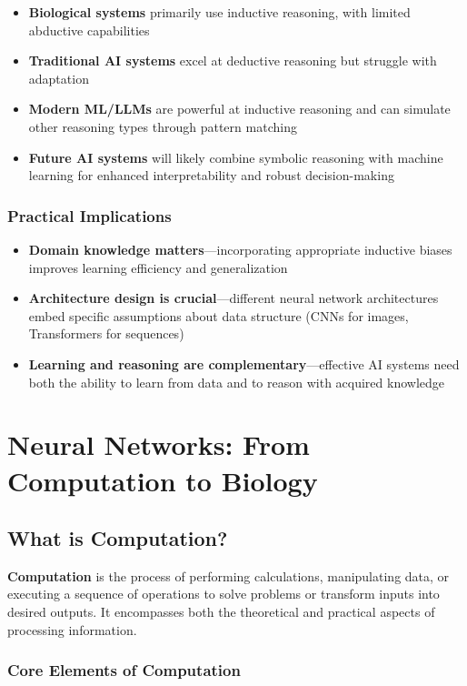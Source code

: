 \begin{itemize}
\item \textbf{Biological systems} primarily use inductive reasoning, with limited abductive capabilities
\item \textbf{Traditional AI systems} excel at deductive reasoning but struggle with adaptation
\item \textbf{Modern ML/LLMs} are powerful at inductive reasoning and can simulate other reasoning types through pattern matching
\item \textbf{Future AI systems} will likely combine symbolic reasoning with machine learning for enhanced interpretability and robust decision-making
\end{itemize}

\subsubsection{Practical Implications}

\begin{itemize}
\item \textbf{Domain knowledge matters}—incorporating appropriate inductive biases improves learning efficiency and generalization
\item \textbf{Architecture design is crucial}—different neural network architectures embed specific assumptions about data structure (CNNs for images, Transformers for sequences)
\item \textbf{Learning and reasoning are complementary}—effective AI systems need both the ability to learn from data and to reason with acquired knowledge
\end{itemize}

\section{Neural Networks: From Computation to Biology}

\subsection{What is Computation?}

\textbf{Computation} is the process of performing calculations, manipulating data, or executing a sequence of operations to solve problems or transform inputs into desired outputs. It encompasses both the theoretical and practical aspects of processing information.

\subsubsection{Core Elements of Computation}

